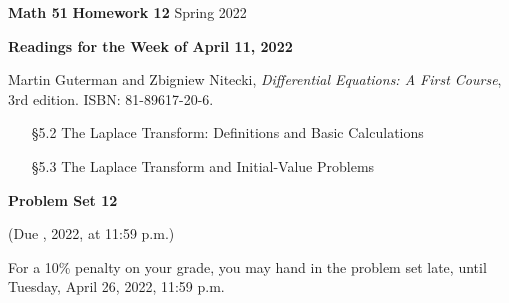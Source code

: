 \documentclass[12pt]{article}
\newcommand{\tred}[1]{{\color{red}{#1}}}
\begin{document}
\noindent
{\large {\bf Math 51}   \hfill  {\bf Homework 12} \hfill   Spring 2022}   

\bigskip
\bigskip

\centerline{\textbf{Readings for the Week of April 11, 2022}}

\medskip
\noindent
Martin Guterman and Zbigniew Nitecki,
  \textit{Differential Equations: A First Course}, 3rd edition.  ISBN: 81-89617-20-6.
\begin{enumerate}
    \item[\S 5.2] The Laplace Transform: Definitions and Basic Calculations
    \item[\S 5.3] The Laplace Transform and Initial-Value Problems
    \end{enumerate}


 \bigskip
\noindent
\centerline{\textbf{Problem Set 12}}
\centerline{(Due \tred{Monday, April 25}, 2022, at 11:59 p.m.)}

\medskip

\noindent
For a 10\% penalty on your grade, you may hand in the problem set
late, until Tuesday, April 26, 2022, 11:59 p.m.

\medskip
\end{document}
